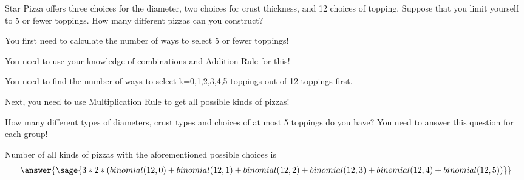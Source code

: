 \documentclass{ximera}
\begin{document}
\begin{problem} 
 Star Pizza offers three choices for the diameter,
two choices for crust thickness, and 12 choices of topping.   Suppose
that you limit yourself to 5 or fewer toppings.   How many different
pizzas can you construct?
\begin{hint}
    \item You first need to calculate the number of ways to select 5 or fewer toppings!
        \begin{hint}
            \item You need to use your knowledge of combinations and Addition Rule for this!
            \item You need to find the number of ways to select k=0,1,2,3,4,5 toppings out of 12 toppings first. 
        \end{hint}
    \item Next, you need to use Multiplication Rule to get all possible kinds of pizzas!
        \begin{hint}
            How many different types of diameters, crust types and choices of at most 5 toppings do you have? You need to answer this question for each group!
        \end{hint}
\end{hint}

\begin{explanation}
    Number of all kinds of pizzas with the aforementioned possible choices is $$\answer{\sage{3*2*(binomial(12,0)+binomial(12,1)+binomial(12,2)+binomial(12,3)+binomial(12,4)+binomial(12,5))} }$$
\end{explanation}
\end{problem}
\end{document}
